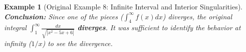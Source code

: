 \documentclass[11pt]{article}
\theoremstyle{mytheoremstyle}
\theoremstyle{mydefinitionstyle}
\newtheorem{example}[theorem]{Example}
\newenvironment{adminnote}
  {\par\medskip\noindent\fbox{\parbox{\dimexpr\textwidth-2\fboxsep-2\fboxrule\relax}{\textbf{Administrative Note:}\itshape\par\medskip}}} %
  {\end{parbox}\medskip} %
\begin{document}
\begin{example}[Original Example 8: Infinite Interval and Interior Singularities]
\textbf{Conclusion:} Since one of the pieces ($\int_4^\infty f(x) dx$) diverges, the original integral $\int_1^\infty \frac{dx}{\sqrt{|x^2-5x+6|}}$ \textbf{diverges}.
It was sufficient to identify the behavior at infinity ($1/x$) to see the divergence.
\end{example}

\end{document}
